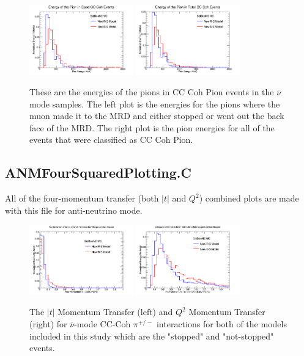 \documentclass[11pt]{article}
\begin{document}
\begin{figure}[H]
\centering
\includegraphics[width=0.4\textwidth]{ANMPionPlottingImages/9-ANMPionPlotting.png}
\includegraphics[width=0.4\textwidth]{ANMPionPlottingImages/12-ANMPionPlotting.png}
\caption{These are the energies of the pions in CC Coh Pion events in the $\bar{\nu}$ mode samples. The left plot is the energies for the pions where the muon made it to the MRD and either stopped or went out the back face of the MRD. The right plot is the pion energies for all of the events that were classified as CC Coh Pion.}
\end{figure}

\subsection{ANMFourSquaredPlotting.C}
All of the four-momentum transfer (both $|t|$ and $Q^2$) combined plots are made with this file for anti-neutrino mode.

\begin{figure}[H]
\centering
\includegraphics[width=0.4\textwidth]{CCCohPlots/ANMCCCohGoodT.png}
\includegraphics[width=0.4\textwidth]{CCCohPlots/ANMCCCohGoodQ2.png}
\caption{The $|t|$ Momentum Transfer (left) and $Q^2$ Momentum Transfer (right) for $\bar{\nu}$-mode CC-Coh $\pi^{+/-}$ interactions for both of the models included in this study which are the "stopped" and "not-stopped" events.}
\end{figure}
\end{document}
